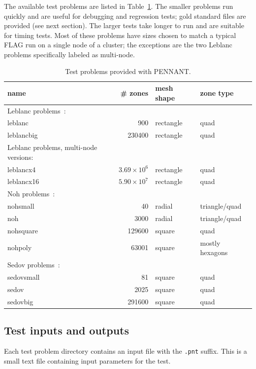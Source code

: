 \documentclass[11pt,letterpaper]{article}
\begin{document}
The available test problems are listed in Table~\ref{tbl:tests}.
The smaller problems run quickly and are useful for debugging and
regression tests; gold standard files are provided (see next section).
The larger tests take longer to run and are suitable for timing tests.
Most of these problems have sizes chosen to match a typical FLAG run
on a single node of a cluster; the exceptions are the two Leblanc
problems specifically labeled as multi-node.

\begin{table}
\centering
\caption{Test problems provided with PENNANT.}
\label{tbl:tests}
\begin{tabular}{lrll}
    \hline
    name & \# zones & mesh shape & zone type \\
    \hline
    Leblanc problems~\cite{leblanc}: \\
    leblanc    &    900 & rectangle & quad \\
    leblancbig & 230400 & rectangle & quad \\
    \hline
    Leblanc problems, multi-node versions: \\
    leblancx4  & $3.69 \times 10^6$ & rectangle & quad \\
    leblancx16 & $5.90 \times 10^7$ & rectangle & quad \\
    \hline
    Noh problems~\cite{noh}: \\
    nohsmall   &     40 & radial    & triangle/quad \\
    noh        &   3000 & radial    & triangle/quad \\
    nohsquare  & 129600 & square    & quad \\
    nohpoly    &  63001 & square    & mostly hexagons \\
    \hline
    Sedov problems~\cite{sedov}: \\
    sedovsmall &     81 & square    & quad \\
    sedov      &   2025 & square    & quad \\
    sedovbig   & 291600 & square    & quad \\
    \hline
\end{tabular}
\end{table}

\subsection{Test inputs and outputs}

Each test problem directory contains an input file with the {\tt.pnt}
suffix.  This is a small text file containing input parameters for the
test.
\end{document}
